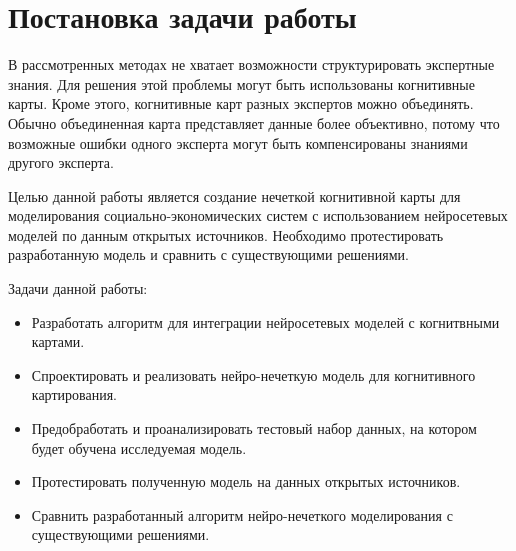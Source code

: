 \section{Постановка задачи работы}

В рассмотренных методах не хватает возможности структурировать экспертные знания.
Для решения этой проблемы могут быть использованы когнитивные карты.
Кроме этого, когнитивные карт разных экспертов можно объединять. Обычно
объединенная карта представляет данные более объективно, потому что возможные
ошибки одного эксперта могут быть компенсированы знаниями другого эксперта.

Целью данной работы является создание нечеткой когнитивной карты для моделирования
социально-экономических систем с использованием нейросетевых моделей по данным открытых источников.
Необходимо протестировать разработанную модель и сравнить с существующими решениями.

Задачи данной работы:
\begin{itemize}
	\item Разработать алгоритм для интеграции нейросетевых моделей с когнитвными картами.
	\item Спроектировать и реализовать нейро-нечеткую модель для когнитивного картирования.
	\item Предобработать и проанализировать тестовый набор данных, на котором будет обучена исследуемая модель.
	\item Протестировать полученную модель на данных открытых источников.
	\item Сравнить разработанный алгоритм нейро-нечеткого моделирования с существующими решениями.
\end{itemize}


